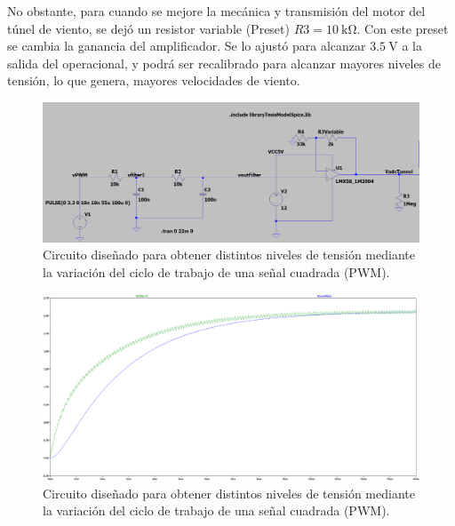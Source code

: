 No obstante, para cuando se mejore la mecánica y transmisión del motor del túnel de viento, se dejó un resistor variable (Preset) $R3=\SI{10}{\kilo\ohm}$. Con este preset se cambia la ganancia del amplificador. Se lo ajustó para alcanzar $\SI{3.5}{\volt}$ a la salida del operacional, y podrá ser recalibrado para alcanzar mayores niveles de tensión, lo que genera, mayores velocidades de viento.

\begin{figure}[H]
    \centering
    \includegraphics[width=1\linewidth]{Figuras/datalogger/Hardware/pwmCircuitSimulate.png}
    \caption{Circuito diseñado para obtener distintos niveles de tensión mediante la variación del ciclo de trabajo de una señal cuadrada (PWM).}
    \label{fig:pwmCircuitSimulate}
\end{figure}


\begin{figure}[H]
    \centering
    \includegraphics[width=1\linewidth]{Figuras/datalogger/Hardware/filter1and2.png}
    \caption{Circuito diseñado para obtener distintos niveles de tensión mediante la variación del ciclo de trabajo de una señal cuadrada (PWM).}
    \label{fig:filter1and2}
\end{figure}



